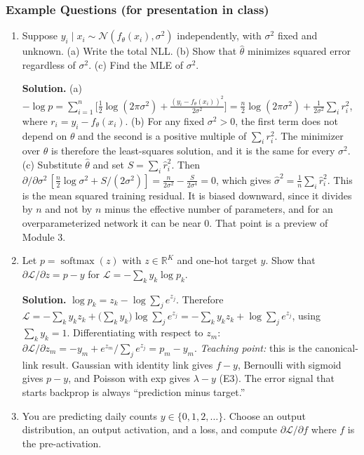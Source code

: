 \documentclass[11pt]{article}
\newcommand{\softmax}{\operatorname{softmax}}
\newcommand{\R}{\mathbb{R}}
\begin{document}
\subsubsection*{Example Questions (for presentation in class)}
\begin{enumerate}[label=\textbf{1.1-E\arabic*}, leftmargin=*]
  \item Suppose $y_i \mid x_i \sim \mathcal N(f_\theta(x_i), \sigma^2)$ independently, with $\sigma^2$ fixed and unknown. (a) Write the total NLL. (b) Show that $\hat\theta$ minimizes squared error regardless of $\sigma^2$. (c) Find the MLE of $\sigma^2$.

  \textbf{Solution.} (a) $\displaystyle -\log p = \sum_{i=1}^n \Big[\tfrac12\log(2\pi\sigma^2) + \frac{(y_i - f_\theta(x_i))^2}{2\sigma^2}\Big] = \frac n2 \log(2\pi\sigma^2) + \frac{1}{2\sigma^2}\sum_i r_i^2$, where $r_i = y_i - f_\theta(x_i)$.
  (b) For any fixed $\sigma^2 > 0$, the first term does not depend on $\theta$ and the second is a positive multiple of $\sum_i r_i^2$. The minimizer over $\theta$ is therefore the least-squares solution, and it is the same for every $\sigma^2$.
  (c) Substitute $\hat\theta$ and set $S = \sum_i \hat r_i^2$. Then $\partial/\partial\sigma^2\,[\tfrac n2\log\sigma^2 + S/(2\sigma^2)] = \tfrac{n}{2\sigma^2} - \tfrac{S}{2\sigma^4} = 0$, which gives $\hat\sigma^2 = \frac1n\sum_i \hat r_i^2$. This is the mean squared training residual. It is biased downward, since it divides by $n$ and not by $n$ minus the effective number of parameters, and for an overparameterized network it can be near 0. That point is a preview of Module 3.

  \item Let $p = \softmax(z)$ with $z \in \R^K$ and one-hot target $y$. Show that $\partial \mathcal L / \partial z = p - y$ for $\mathcal L = -\sum_k y_k \log p_k$.

  \textbf{Solution.} $\log p_k = z_k - \log\sum_j e^{z_j}$. Therefore $\mathcal L = -\sum_k y_k z_k + \big(\sum_k y_k\big)\log\sum_j e^{z_j} = -\sum_k y_k z_k + \log\sum_j e^{z_j}$, using $\sum_k y_k = 1$. Differentiating with respect to $z_m$: $\partial\mathcal L/\partial z_m = -y_m + e^{z_m}/\sum_j e^{z_j} = p_m - y_m$. \emph{Teaching point:} this is the canonical-link result. Gaussian with identity link gives $f - y$, Bernoulli with sigmoid gives $p - y$, and Poisson with exp gives $\lambda - y$ (E3). The error signal that starts backprop is always ``prediction minus target.''

  \item You are predicting daily counts $y \in \{0,1,2,\dots\}$. Choose an output distribution, an output activation, and a loss, and compute $\partial\mathcal L/\partial f$ where $f$ is the pre-activation.


\end{enumerate}
\end{document}

